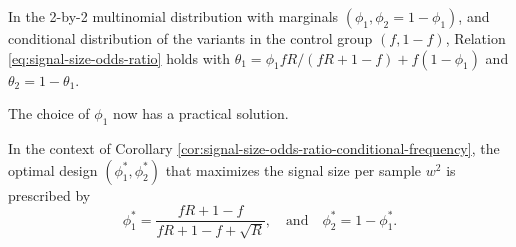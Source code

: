 \begin{corollary} \label{cor:signal-size-odds-ratio-conditional-frequency}
In the 2-by-2 multinomial distribution with marginals $(\phi_1, \phi_2 = 1-\phi_1)$, and conditional distribution of the variants in the control group $(f, 1-f)$,
Relation \eqref{eq:signal-size-odds-ratio} holds with $\theta_1 = {\phi_1fR}/{(fR+1-f)} + f(1-\phi_1)$ and $\theta_2 = 1-\theta_1$.
\end{corollary} 

The choice of $\phi_1$ now has a practical solution.

\begin{corollary} \label{cor:optimal-design}
In the context of Corollary \ref{cor:signal-size-odds-ratio-conditional-frequency},
the optimal design $(\phi^*_1, \phi^*_2)$ that maximizes the signal size per sample $w^2$ is prescribed by
\begin{equation} \label{eq:optimal-design}
    \phi_1^* = \frac{fR+1-f}{fR+1-f+\sqrt{R}}, \quad\text{and}\quad 
    \phi_2^* = 1-\phi_1^*.
\end{equation}
\end{corollary} 


